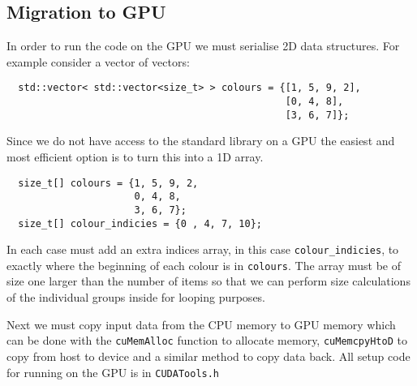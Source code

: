 \subsection*{Migration to GPU}
In order to run the code on the GPU we must serialise 2D data structures. For example consider a vector of vectors:
\begin{verbatim}
  std::vector< std::vector<size_t> > colours = {[1, 5, 9, 2],
                                                [0, 4, 8],
                                                [3, 6, 7]};
\end{verbatim}
Since we do not have access to the standard library on a GPU the easiest and most efficient option is to turn this into a 1D array.
\begin{verbatim}
  size_t[] colours = {1, 5, 9, 2,
                      0, 4, 8,
                      3, 6, 7};
  size_t[] colour_indicies = {0 , 4, 7, 10};
\end{verbatim}
In each case must add an extra indices array, in this case \verb!colour_indicies!, to exactly where the beginning of each colour is in \verb!colours!. The array must be of size one larger than the number of items so that we can perform size
calculations of the individual groups inside for looping purposes.

Next we must copy input data from the CPU memory to GPU memory which can be done with the \verb!cuMemAlloc! function to allocate memory, \verb!cuMemcpyHtoD! to copy from host to device and a similar method to copy data back. All setup code for running on the GPU is in \verb!CUDATools.h!

